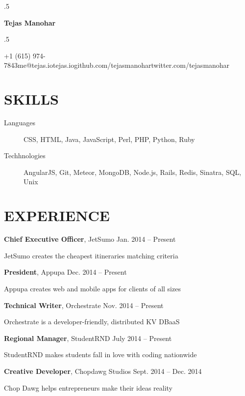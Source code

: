 \documentclass{res}
\newcommand*{\its}{\hspace{0.8cm}}
\begin{document}
\moveleft.5\hoffset\centerline{\Huge\bf Tejas Manohar}
\bigskip
\moveleft.5\hoffset\centerline{+1 (615) 974-7843\its{}me@tejas.io\its{}\its{}tejas.io\its{}github.com/tejasmanohar\its{}twitter.com/tejasmanohar}

\section{SKILLS}

\begin{description}
  \item[Languages] CSS, HTML, Java, JavaScript, Perl, PHP, Python, Ruby
  \item[Techhnologies] AngularJS, Git, Meteor, MongoDB, Node.js, Rails, Redis, Sinatra, SQL, Unix
\end{description}

\section{EXPERIENCE}

{\bf Chief Executive Officer}, JetSumo \hfill Jan. 2014 -- Present
\begin{description}
  \item JetSumo creates the cheapest itineraries matching criteria
\end{description}

{\bf President}, Appupa \hfill Dec. 2014 -- Present
\begin{description}
  \item Appupa creates web and mobile apps for clients of all sizes
\end{description}

{\bf Technical Writer}, Orchestrate \hfill Nov. 2014 -- Present
\begin{description}
  \item Orchestrate is a developer-friendly, distributed KV DBaaS
\end{description}

{\bf Regional Manager}, StudentRND \hfill July 2014 -- Present
\begin{description}
  \item StudentRND makes students fall in love with coding nationwide
\end{description}

{\bf Creative Developer}, Chopdawg Studios \hfill Sept. 2014 -- Dec. 2014
\begin{description}
  \item Chop Dawg helps entrepreneurs make their ideas reality
\end{description}
\end{document}
